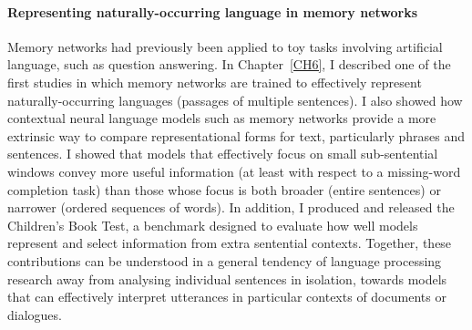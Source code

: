 \paragraph{Representing naturally-occurring language in memory networks} Memory networks had previously been applied to toy tasks involving artificial language, such as question answering. In Chapter~\ref{CH6}, I described one of the first studies in which memory networks are trained to effectively represent naturally-occurring languages (passages of multiple sentences). I also showed how contextual neural language models such as memory networks provide a more extrinsic way to compare representational forms for text, particularly phrases and sentences. I showed that models that effectively focus on small sub-sentential windows convey more useful information (at least with respect to a missing-word completion task) than those whose focus is both broader (entire sentences) or narrower (ordered sequences of words). In addition, I produced and released the Children's Book Test, a benchmark designed to evaluate how well models represent and select information from extra sentential contexts. Together, these contributions can be understood in a general tendency of language processing research away from analysing individual sentences in isolation, towards models that can effectively interpret utterances in particular contexts of documents or dialogues.  

